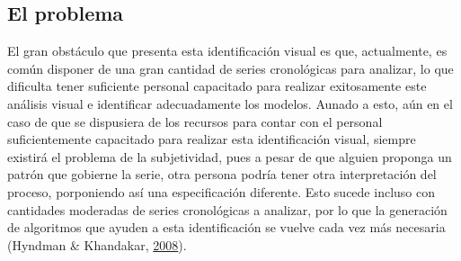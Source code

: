 \documentclass[
]{article}
\begin{document}
\subsection{El problema}

El gran obstáculo que presenta esta identificación visual es que,
actualmente, es común disponer de una gran cantidad de series
cronológicas para analizar, lo que dificulta tener suficiente personal
capacitado para realizar exitosamente este análisis visual e identificar
adecuadamente los modelos. Aunado a esto, aún en el caso de que se
dispusiera de los recursos para contar con el personal suficientemente
capacitado para realizar esta identificación visual, siempre existirá el
problema de la subjetividad, pues a pesar de que alguien proponga un
patrón que gobierne la serie, otra persona podría tener otra
interpretación del proceso, porponiendo así una especificación
diferente. Esto sucede incluso con cantidades moderadas de series
cronológicas a analizar, por lo que la generación de algoritmos que
ayuden a esta identificación se vuelve cada vez más necesaria (Hyndman
\& Khandakar, \protect\hyperlink{ref-auto.arima}{2008}).
\end{document}
